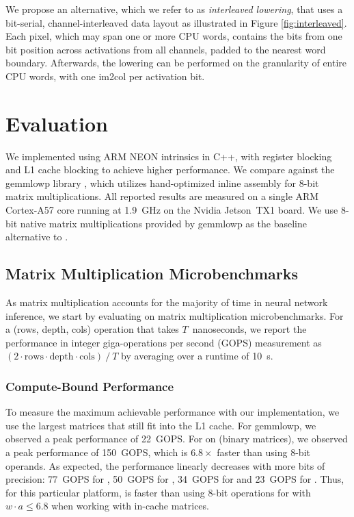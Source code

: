 \documentclass[sigconf]{acmart}
\begin{document}
We propose an alternative, which we refer to as \emph{interleaved lowering}, that uses a bit-serial, channel-interleaved data layout as illustrated in Figure \ref{fig:interleaved}.
Each pixel, which may span one or more CPU words, contains the bits from one bit position across activations from all channels, padded to the nearest word boundary.
Afterwards, the lowering can be performed on the granularity of entire CPU words, with one im2col per activation bit.

\section{Evaluation}
We implemented \ours{} using ARM NEON intrinsics in C++, with register blocking and L1 cache blocking to achieve higher performance.
We compare against the gemmlowp library \cite{gemmlowp}, which utilizes hand-optimized inline assembly for 8-bit matrix multiplications.
All reported results are measured on a single ARM Cortex-A57 core running at 1.9~GHz on the Nvidia Jetson~TX1 board.
We use 8-bit native matrix multiplications provided by gemmlowp \cite{gemmlowp} as the baseline alternative to \ours{}.

\subsection{Matrix Multiplication Microbenchmarks}
As matrix multiplication accounts for the majority of time in neural network inference, we start by evaluating \ours{} on matrix multiplication microbenchmarks.
For a (rows, depth, cols) operation that takes $T$~nanoseconds, we report the performance in integer giga-operations per second (GOPS) measurement as $(2\cdot\mathrm{rows}\cdot\mathrm{depth}\cdot\mathrm{cols}) \mathrel{/} T$ by averaging over a runtime of 10~s.

\subsubsection{Compute-Bound Performance}
\label{sec:peakperf}
To measure the maximum achievable performance with our implementation, we use the largest matrices that still fit into the L1 cache.
For gemmlowp, we observed a peak performance of 22~GOPS.
For \ours{} on  (binary matrices), we observed a peak performance of 150~GOPS, which is $6.8\times$ faster than using 8-bit operands.
As expected, the performance linearly decreases with more bits of precision: 77~GOPS for , 50~GOPS for , 34~GOPS for  and 23~GOPS for .
Thus, for this particular platform, \ours{} is faster than using 8-bit operations for  with $w \cdot a \leq 6.8$ when working with in-cache matrices.
\end{document}
